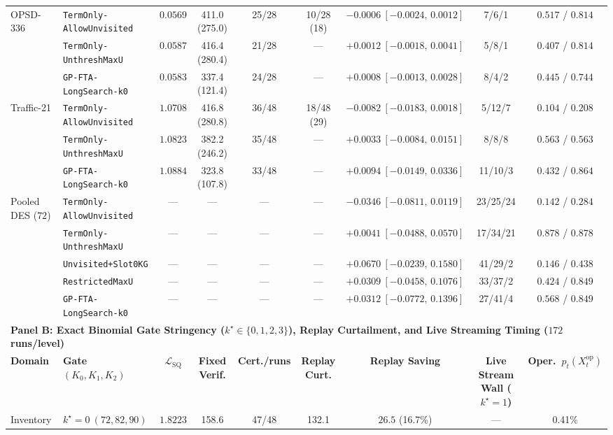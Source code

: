 \begin{table}[htbp]
{\begin{tabular}{llccccccc}
\midrule
\multirow{3}{*}{OPSD-336} & \texttt{TermOnly-AllowUnvisited} & $0.0569$ & 411.0 (275.0) & 25/28 & 10/28 (18) & $-0.0006\ [-0.0024,\,0.0012]$ & 7/6/1 & $0.517$ / $0.814$ \\
 & \texttt{TermOnly-UnthreshMaxU} & $0.0587$ & 416.4 (280.4) & 21/28 & --- & $+0.0012\ [-0.0018,\,0.0041]$ & 5/8/1 & $0.407$ / $0.814$ \\
 & \texttt{GP-FTA-LongSearch-k0} & $0.0583$ & 337.4 (121.4) & 24/28 & --- & $+0.0008\ [-0.0013,\,0.0028]$ & 8/4/2 & $0.445$ / $0.744$ \\
\midrule
\multirow{3}{*}{Traffic-21} & \texttt{TermOnly-AllowUnvisited} & $1.0708$ & 416.8 (280.8) & 36/48 & 18/48 (29) & $-0.0082\ [-0.0183,\,0.0018]$ & 5/12/7 & $0.104$ / $0.208$ \\
 & \texttt{TermOnly-UnthreshMaxU} & $1.0823$ & 382.2 (246.2) & 35/48 & --- & $+0.0033\ [-0.0084,\,0.0151]$ & 8/8/8 & $0.563$ / $0.563$ \\
 & \texttt{GP-FTA-LongSearch-k0} & $1.0884$ & 323.8 (107.8) & 33/48 & --- & $+0.0094\ [-0.0149,\,0.0336]$ & 11/10/3 & $0.432$ / $0.864$ \\
\midrule
\multirow{5}{*}{Pooled DES ($72$)} & \texttt{TermOnly-AllowUnvisited} & --- & --- & --- & --- & $-0.0346\ [-0.0811,\,0.0119]$ & 23/25/24 & $0.142$ / $0.284$ \\
 & \texttt{TermOnly-UnthreshMaxU} & --- & --- & --- & --- & $+0.0041\ [-0.0488,\,0.0570]$ & 17/34/21 & $0.878$ / $0.878$ \\
 & \texttt{Unvisited+Slot0KG} & --- & --- & --- & --- & $+0.0670\ [-0.0239,\,0.1580]$ & 41/29/2 & $0.146$ / $0.438$ \\
 & \texttt{RestrictedMaxU} & --- & --- & --- & --- & $+0.0309\ [-0.0458,\,0.1076]$ & 33/37/2 & $0.424$ / $0.849$ \\
 & \texttt{GP-FTA-LongSearch-k0} & --- & --- & --- & --- & $+0.0312\ [-0.0772,\,0.1396]$ & 27/41/4 & $0.568$ / $0.849$ \\
\midrule
\multicolumn{9}{l}{\textbf{Panel B: Exact Binomial Gate Stringency ($k^\star\in\{0,1,2,3\}$), Replay Curtailment, and Live Streaming Timing ($172$ runs/level)}} \\
\textbf{Domain} & \textbf{Gate $(K_0,K_1,K_2)$} & \textbf{$\mathcal{L}_{\mathrm{SQ}}$} & \textbf{Fixed Verif.} & \textbf{Cert./runs} & \textbf{Replay Curt.} & \textbf{Replay Saving} & \textbf{Live Stream Wall ($k^\star\!=\!1$)} & \textbf{Oper.\ $p_t(X_t^{\mathrm{op}})$} \\
\midrule
\multirow{4}{*}{Inventory} & $k^\star\!=\!0\ (72,82,90)$ & $1.8223$ & 158.6 & 47/48 & 132.1 & $26.5$ (16.7\%) & --- & 0.41\% \\

\end{tabular}}
\end{table}

